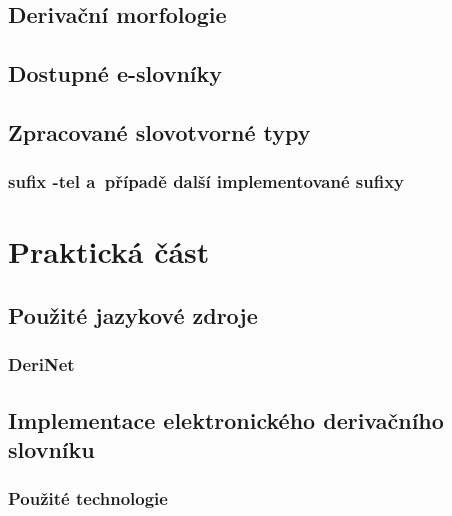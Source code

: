 \hypertarget{derivaux10dnuxed-morfologie}{%
\chapter{Derivační morfologie}\label{derivaux10dnuxed-morfologie}}

\hypertarget{dostupnuxe9-e-slovnuxedky}{%
\chapter{Dostupné e-slovníky}\label{dostupnuxe9-e-slovnuxedky}}

\hypertarget{zpracovanuxe9-slovotvornuxe9-typy}{%
\chapter{Zpracované slovotvorné
typy}\label{zpracovanuxe9-slovotvornuxe9-typy}}

\hypertarget{sufix--tel-a-pux159uxedpadux11b-dalux161uxed-implementovanuxe9-sufixy}{%
\section{sufix -tel a~případě další implementované
sufixy}\label{sufix--tel-a-pux159uxedpadux11b-dalux161uxed-implementovanuxe9-sufixy}}

\part{Praktická část}

\hypertarget{pouux17eituxe9-jazykovuxe9-zdroje}{%
\chapter{Použité jazykové
zdroje}\label{pouux17eituxe9-jazykovuxe9-zdroje}}

\hypertarget{derinet}{%
\section{DeriNet}\label{derinet}}

\hypertarget{implementace-elektronickuxe9ho-derivaux10dnuxedho-slovnuxedku}{%
\chapter{Implementace elektronického derivačního
slovníku}\label{implementace-elektronickuxe9ho-derivaux10dnuxedho-slovnuxedku}}

\hypertarget{pouux17eituxe9-technologie}{%
\section{Použité technologie}\label{pouux17eituxe9-technologie}}

